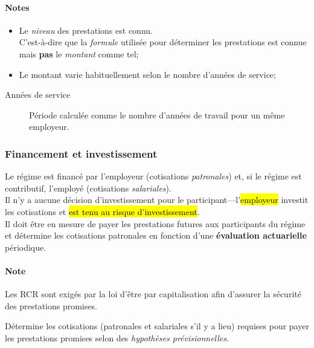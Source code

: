 \documentclass[10pt, french]{article}
\begin{document}
\begin{multicols*}{3}
\begin{definitionNOHFILL}[Description]
\paragraph{Notes}
\begin{itemize}[leftmargin = *]
	\item	Le \textit{niveau} des prestations est connu.\\
			C'est-à-dire que la \textit{formule} utilisée pour déterminer les prestations est connue mais \textbf{pas} le \textit{montant} comme tel;
	\item	Le montant varie habituellement selon le nombre d'années de service;
\end{itemize}
\begin{description}
	\item[Années de service]	Période calculée comme le nombre d'années de travail pour un même employeur.
\end{description}
\end{definitionNOHFILL}

\subsubsection*{Financement et investissement}

Le régime est financé par l'employeur (cotisations \textit{patronales}) et, si le régime est contributif, l'employé (cotisations \textit{salariales}).\\

Il n'y a aucune décision d'investissement pour le participant---l'\hl{employeur} investit les cotisations et \hl{est tenu au risque d'investissement}. \\

Il doit être en mesure de payer les prestations futures aux participants du régime et détermine les cotisations patronales en fonction d'une \textbf{évaluation actuarielle} périodique. 

\paragraph*{Note}	Les RCR sont exigés par la loi d'être par capitalisation afin d'assurer la sécurité des prestations promises.

\begin{definitionNOHFILLsub}
Détermine les cotisations (patronales et salariales s'il y a lieu) requises pour payer les prestations promises selon des \textit{hypothèses prévisionnelles}.


\end{definitionNOHFILLsub}
\end{multicols*}
\end{document}
